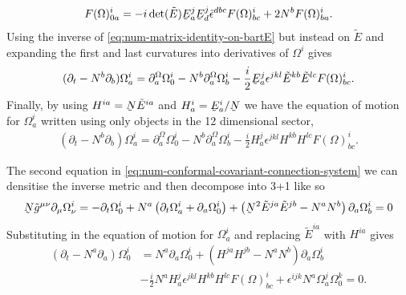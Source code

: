 \documentclass[10pt]{report}
\newcommand{\utilde}[1]{\underaccent{\tilde}{#1}}
\theoremstyle{definition}
\newcommand{\teps}[0]{\tilde{\epsilon}}
\newcommand{\tE}[0]{\tilde{E}}
\newcommand{\tg}[0]{\tilde{g}}
\newcommand{\dlap}[0]{\utilde{N}}
\newcommand{\utE}[0]{\utilde{E}}
\begin{document}
        \begin{align}
            F(\Omega)^i_{0a} = -i \det(\tE) \utE^j_a \utE^j_d  \teps^{dbc} F(\Omega)^i_{bc} + 2 N^b F(\Omega)^i_{ba}.
        \end{align}
        Using the inverse of \cref{eq:num-matrix-identity-on-bartE} but instead on $\tE$ and expanding the first and last curvatures into derivatives of $\Omega^i$ gives
        \begin{align}
            (\partial_t - N^b \partial_b) \Omega^i_a = \partial^\Omega_a \Omega^i_0 - N^b \partial^\Omega_a \Omega^i_b - \frac{i}{2} \utE^j_a \epsilon^{jkl} \tE^{kb} \tE^{lc} F(\Omega)^i_{bc}.
        \end{align}
        Finally, by using $H^{ia} = \dlap\tE^{ia}$ and $H^i_a = \utE^i_a/\dlap$ we have the equation of motion for $\Omega^i_a$ written using only objects in the 12 dimensional sector,
        \begin{align}
            (\partial_t - N^b \partial_b) \Omega^i_a = \partial^\Omega_a \Omega^i_0 - N^b \partial^\Omega_a \Omega^i_b - \frac{i}{2} H^j_a \epsilon^{jkl} H^{kb} H^{lc} F(\Omega)^i_{bc}.
        \end{align}

        The second equation in \cref{eq:num-conformal-covariant-connection-system} we can densitise the inverse metric and then decompose into 3+1 like so 
        \begin{align}
            \dlap \tg^{\mu\nu} \partial_\mu \Omega^i_\nu = -\partial_t \Omega^i_0 + N^a \left( \partial_t \Omega^i_a + \partial_a \Omega^i_0 \right) + \left(\dlap^2 \tE^{ja} \tE^{jb} - N^a N^b\right) \partial_a \Omega^i_b = 0
        \end{align}
        Substituting in the equation of motion for $\Omega^i_a$ and replacing $\tE^{ia}$ with $H^{ia}$ gives
        \begin{align}
            (\partial_t - N^a \partial_a) \Omega^i_0 & = N^a \partial_a \Omega^i_0 + ( H^{ja} H^{jb} - N^a N^b ) \partial_a \Omega^i_b \nonumber \\ & - \frac{i}{2} N^a H^j_a \epsilon^{jkl} H^{kb} H^{lc} F(\Omega)^i_{bc} + \epsilon^{ijk} N^a \Omega^j_a \Omega^k_0 = 0.
        \end{align}
\end{document}
